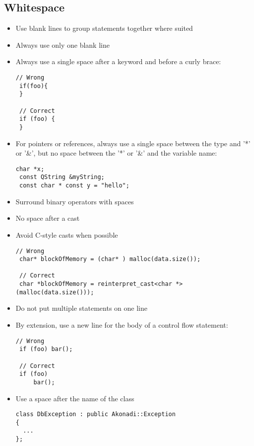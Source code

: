 \documentclass[a4paper,12pt]{article}
\begin{document}
\subsection{Whitespace}
\begin{itemize}
\item Use blank lines to group statements together where suited
\item Always use only one blank line
\item Always use a single space after a keyword and before a curly brace:
\begin{lstlisting}[breaklines]
 // Wrong
 if(foo){
 }

 // Correct
 if (foo) {
 }
 \end{lstlisting}
\item For pointers or references, always use a single space between the type and '*' or '\&', but no space between the '*' or '\&' and the variable name:
\begin{lstlisting}[breaklines]
 char *x;
 const QString &myString;
 const char * const y = "hello";
 \end{lstlisting}
\item Surround binary operators with spaces
\item No space after a cast
\item Avoid C-style casts when possible
\begin{lstlisting}[breaklines]
 // Wrong
 char* blockOfMemory = (char* ) malloc(data.size());

 // Correct
 char *blockOfMemory = reinterpret_cast<char *>(malloc(data.size()));
 \end{lstlisting}
\item Do not put multiple statements on one line
\item By extension, use a new line for the body of a control flow statement:
\begin{lstlisting}[breaklines]
 // Wrong
 if (foo) bar();

 // Correct
 if (foo)
     bar();
 \end{lstlisting}
\item Use a space after the name of the class
\begin{lstlisting}[breaklines]
class DbException : public Akonadi::Exception
{
  ...
};
 \end{lstlisting}
\end{itemize}
\end{document}
